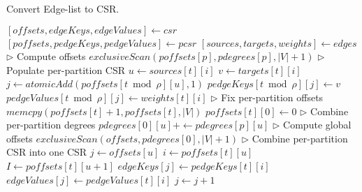 \begin{algorithm}[hbtp]
\caption{Convert Edge-list to CSR.}
\label{alg:csr}
\begin{algorithmic}[1]

\Statex

  \State $[offsets, edgeKeys, edgeValues] \gets csr$ \label{alg:csr--initialize-begin}
  \State $[poffsets, pedgeKeys, pedgeValues] \gets pcsr$
  \State $[sources, targets, weights] \gets edges$ \label{alg:csr--initialize-end}
  \State $\rhd$ Compute offsets
  \ForAll{$p \in [0, \rho)$} \label{alg:csr--poffsets-begin}
    \State $exclusiveScan(poffsets[p], pdegrees[p], |V|+1)$
  \EndFor \label{alg:csr--poffsets-end}
  \State $\rhd$ Populate per-partition CSR
   \label{alg:csr--pcsr-begin}
    \ForAll{$i \in [0, counts[t])$}
      \State $u \gets sources[t][i]$
      \State $v \gets targets[t][i]$
      \State $j \gets atomicAdd(poffsets[t \bmod \rho][u], 1)$
      \State $pedgeKeys[t \bmod \rho][j] \gets v$
        \State $pedgeValues[t \bmod \rho][j] \gets weights[t][i]$
      \EndIf
    \EndFor
  \EndFor \label{alg:csr--pcsr-end}
  \State $\rhd$ Fix per-partition offsets
   \label{alg:csr--poffsets-fix-begin}
      \State $memcpy(poffsets[t]+1, poffsets[t], |V|)$
      \State $poffsets[t][0] \gets 0$
    \EndIf
  \EndFor \label{alg:csr--poffsets-fix-end}
  \State $\rhd$ Combine per-partition degrees
  \ForAll{$u \in [0, |V|)$ \textbf{in parallel}} \label{alg:csr--poffsets-combine-begin}
    \ForAll{$p \in [1, \rho)$}
      \State $pdegrees[0][u] +\gets pdegrees[p][u]$
    \EndFor
  \EndFor \label{alg:csr--poffsets-combine-end}
  \State $\rhd$ Compute global offsets
  \State $exclusiveScan(offsets, pdegrees[0], |V|+1)$ \label{alg:csr--offsets-compute}
  \State $\rhd$ Combine per-partition CSR into one CSR
  \ForAll{$u \in [0, |V|)$ \textbf{in parallel}} \label{alg:csr--pcsr-combine-begin}
    \State $j \gets offsets[u]$
    \ForAll{$p \in [0, \rho)$}
      \State $i \gets poffsets[t][u]$
      \State $I \gets poffsets[t][u+1]$
      \ForAll{$i \in [i, I)$}
        \State $edgeKeys[j] \gets pedgeKeys[t][i]$
          \State $edgeValues[j] \gets pedgeValues[t][i]$
        \EndIf
        \State $j \gets j + 1$
      \EndFor
    \EndFor
  \EndFor \label{alg:csr--pcsr-combine-end}
\EndFunction
\end{algorithmic}
\end{algorithm}
